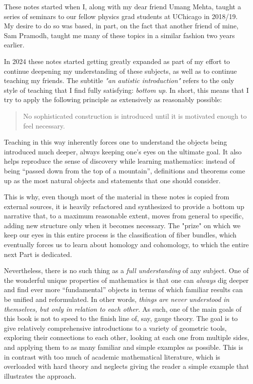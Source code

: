 
These notes started when I, along with my dear friend Umang Mehta, taught a series of seminars to our fellow physics grad students at UChicago in 2018/19. My desire to do so was based, in part, on the fact that another friend of mine, Sam Pramodh, taught me many of these topics in a similar fashion two years earlier.

In 2024 these notes started getting greatly expanded as part of my effort to continue deepening my understanding of these subjects, as well as to continue teaching my friends. The subtitle \emph{"an autistic introduction"} refers to the only style of teaching that I find fully satisfying: \emph{bottom up}. In short, this means that I try to apply the following principle as extensively as reasonably possible:
\begin{quote}
    No sophisticated construction is introduced until it is motivated enough to feel necessary.
\end{quote}
Teaching in this way inherently forces one to understand the objects being introduced much deeper, always keeping one's eyes on the ultimate goal. It also helps reproduce the sense of discovery while learning mathematics: instead of being ``passed down from the top of a mountain'', definitions and theorems come up as the most natural objects and statements that one should consider. 

This is why, even though most of the material in these notes is copied from external sources, it is heavily refactored and synthesized to provide a bottom up narrative that, to a maximum reasonable extent, moves from general to specific, adding new structure only when it becomes necessary. The "prize" on which we keep our eyes in this entire process is the classification of fiber bundles, which eventually forces us to learn about homology and cohomology, to which the entire next Part is dedicated. 

Nevertheless, there is no such thing as a \emph{full understanding} of any subject. One of the wonderful unique properties of mathematics is that one can \emph{always} dig deeper and find ever more ``fundamental'' objects in terms of which familiar results can be unified and reformulated. In other words, \emph{things are never understood in themselves, but only in relation to each other}. As such, one of the main goals of this book is not to speed to the finish line of, say, gauge theory. The goal is to give relatively comprehensive introductions to a variety of geometric tools, exploring their connections to each other, looking at each one from multiple sides, and applying them to as many familiar and simple examples as possible. This is in contrast with too much of academic mathematical literature, which is overloaded with hard theory and neglects giving the reader a simple example that illustrates the approach.

